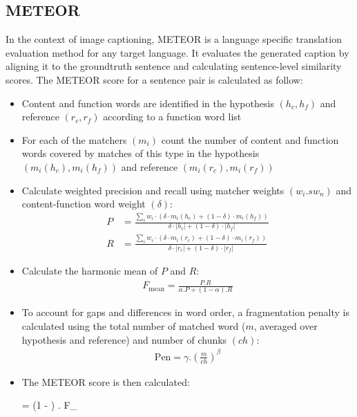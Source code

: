 \subsection{METEOR}
In the context of image captioning, METEOR \cite{denkowski:lavie:meteor-wmt:2014} is a language specific translation evaluation method for any target language. It evaluates the generated caption by aligning it to the groundtruth sentence and calculating sentence-level similarity scores.
The METEOR score for a sentence pair is calculated as follow:
\begin{itemize}
	\item Content and function words are identified in the hypothesis $\left(h_c, h_f\right)$ and reference $\left(r_c, r_f \right)$ according to a function word list

	\item For each of the matchers $\left( m_i \right)$ count the number of content and function words covered by matches of this type in the hypothesis $\left(m_i\left(h_c\right), m_i\left(h_f\right)\right)$ and reference $\left(m_i\left(r_c\right), m_i\left(r_f\right) \right)$

	\item Calculate weighted precision and recall using matcher weights $\left(w_i .s w_n\right)$ and content-function word weight $\left( \delta \right)$:
	\begin{align}
		P &= \frac{\sum_i w_i \cdot \left( \delta \cdot m_i\left(h_c\right) + \left(1 - \delta \right) \cdot m_i \left(h_f\right) \right)}{\delta \cdot |h_c| + \left( 1 - \delta \right) \cdot |h_f|} \\
		R &= \frac{\sum_i w_i \cdot \left( \delta \cdot m_i\left(r_c\right) + \left(1 - \delta \right) \cdot m_i \left(r_f\right) \right)}{\delta \cdot |r_c| + \left( 1 - \delta \right) \cdot |r_f|}
	\end{align}

	\item Calculate the harmonic mean of $P$ and $R$:
	\begin{align}
		F_{\text{mean}} = \frac{P . R}{\alpha . P + \left( 1 - \alpha \right) . R}
	\end{align}

	\item To account for gaps and differences in word order, a fragmentation penalty is calculated using the total number of matched word ($m$, averaged over hypothesis and reference) and number of chunks $\left(ch\right)$:
	\begin{align}
		\text{Pen} = \gamma . \left( \frac{m}{ch} \right) ^ \beta
	\end{align}

	\item The METEOR score is then calculated:
	\begin{tcolorbox}[ams align, colback=yellow!10!white,colframe=bordeuxcolor]
		\centering
		 = \left(1 -  \right) . F_{}
	\end{tcolorbox}
\end{itemize}


